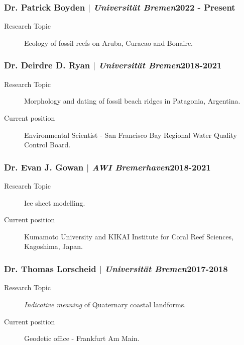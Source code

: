 \documentclass[11pt]{article}
\begin{document}
\subsubsection{Dr. Patrick Boyden $|$ {\normalfont\textit{Universität Bremen}}\hfill 2022 - Present}
{\footnotesize 
\begin{description}
  \item [Research Topic] Ecology of fossil reefs on Aruba, Curacao and Bonaire. 
\end{description}
}

\smallskip
\subsubsection{Dr. Deirdre D. Ryan $|$ {\normalfont\textit{Universität Bremen}}\hfill 2018-2021}
{\footnotesize 
\begin{description}
  \item [Research Topic] Morphology and dating of fossil beach ridges in Patagonia, Argentina. 
  \item [Current position] Environmental Scientist - San Francisco Bay Regional Water Quality Control Board. 
\end{description}
}

\smallskip
\subsubsection{Dr. Evan J. Gowan $|$ {\normalfont\textit{AWI Bremerhaven}}\hfill 2018-2021}
{\footnotesize 
\begin{description}
  \item [Research Topic] Ice sheet modelling. 
  \item [Current position] Kumamoto University and KIKAI Institute for Coral Reef Sciences, Kagoshima, Japan. 
\end{description}
}
\smallskip
\subsubsection{Dr. Thomas Lorscheid $|$ {\normalfont\textit{Universität Bremen}}\hfill 2017-2018}
{\footnotesize 
\begin{description}
  \item [Research Topic] \textit{Indicative meaning} of Quaternary coastal landforms. 
  \item [Current position] Geodetic office - Frankfurt Am Main. 
\end{description}
}
\end{document}

